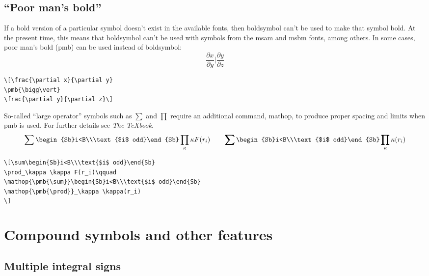 \documentclass[draft]{amsart}
\newcommand{\ntt}{\normalfont\ttfamily}
\newcommand{\cn}[1]{{\protect\ntt\bslash#1}}
\theoremstyle{definition}
\theoremstyle{remark}
\begin{document}
\subsection{``Poor man's bold''}
If a bold version of a particular symbol doesn't exist in the
available fonts,
then \cn{boldsymbol} can't be used to make that symbol bold.
At the present time, this means that
\cn{boldsymbol} can't be used with symbols from
the {\sc msam} and {\sc msbm} fonts, among others.
In some cases, poor man's bold (\cn{pmb}) can be used instead
of \cn{boldsymbol}:
\[\frac{\partial x}{\partial y}
\pmb{\bigg\vert}
\frac{\partial y}{\partial z}\]
\begin{verbatim}
\[\frac{\partial x}{\partial y}
\pmb{\bigg\vert}
\frac{\partial y}{\partial z}\]
\end{verbatim}
So-called ``large operator'' symbols such as $\sum$ and $\prod$
require an additional command, \cn{mathop},
to produce proper spacing and limits when \cn{pmb} is used.
For further details see \textit{The \TeX book}.
\[\sum\begin{Sb}i<B\\\text{$i$ odd}\end{Sb}
\prod_\kappa \kappa F(r_i)\qquad
\mathop{\pmb{\sum}}\begin{Sb}i<B\\\text{$i$ odd}\end{Sb}
\mathop{\pmb{\prod}}_\kappa \kappa(r_i)
\]
\begin{verbatim}
\[\sum\begin{Sb}i<B\\\text{$i$ odd}\end{Sb}
\prod_\kappa \kappa F(r_i)\qquad
\mathop{\pmb{\sum}}\begin{Sb}i<B\\\text{$i$ odd}\end{Sb}
\mathop{\pmb{\prod}}_\kappa \kappa(r_i)
\]
\end{verbatim}

\section{Compound symbols and other features}
\label{s:comp}
\subsection{Multiple integral signs}
\end{document}
